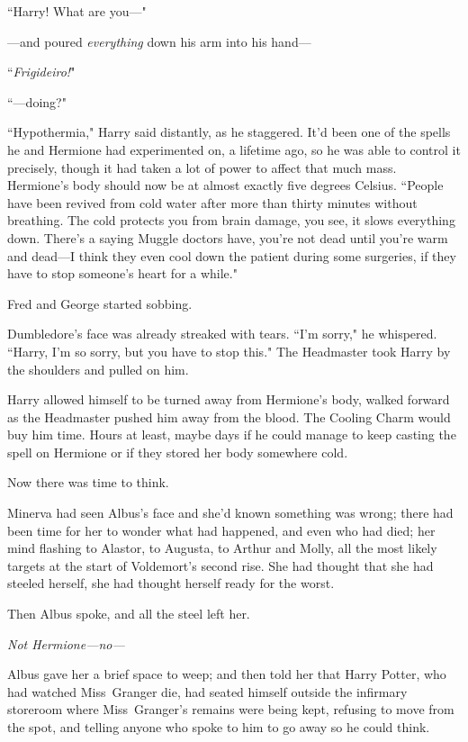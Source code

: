 ``Harry! What are you---"

---and poured \emph{everything} down his arm into his hand---

``\emph{Frigideiro!}"

``---doing?"

``Hypothermia," Harry said distantly, as he staggered. It'd been one of the spells he and Hermione had experimented on, a lifetime ago, so he was able to control it precisely, though it had taken a lot of power to affect that much mass. Hermione's body should now be at almost exactly five degrees Celsius. ``People have been revived from cold water after more than thirty minutes without breathing. The cold protects you from brain damage, you see, it slows everything down. There's a saying Muggle doctors have, you're not dead until you're warm and dead---I think they even cool down the patient during some surgeries, if they have to stop someone's heart for a while."

Fred and George started sobbing.

Dumbledore's face was already streaked with tears. ``I'm sorry," he whispered. ``Harry, I'm so sorry, but you have to stop this." The Headmaster took Harry by the shoulders and pulled on him.

Harry allowed himself to be turned away from Hermione's body, walked forward as the Headmaster pushed him away from the blood. The Cooling Charm would buy him time. Hours at least, maybe days if he could manage to keep casting the spell on Hermione or if they stored her body somewhere cold.

Now there was time to think.

\later

Minerva had seen Albus's face and she'd known something was wrong; there had been time for her to wonder what had happened, and even who had died; her mind flashing to Alastor, to Augusta, to Arthur and Molly, all the most likely targets at the start of Voldemort's second rise. She had thought that she had steeled herself, she had thought herself ready for the worst.

Then Albus spoke, and all the steel left her.

\emph{Not Hermione---no---}

Albus gave her a brief space to weep; and then told her that Harry Potter, who had watched Miss~Granger die, had seated himself outside the infirmary storeroom where Miss~Granger's remains were being kept, refusing to move from the spot, and telling anyone who spoke to him to go away so he could think.

